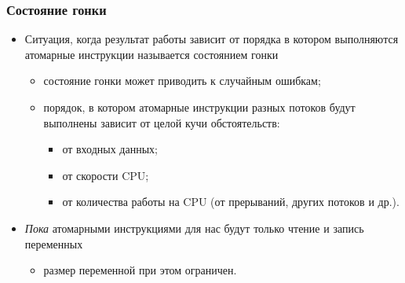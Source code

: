 \begin{frame}
\frametitle{Состояние гонки}
\begin{itemize}
  \item Ситуация, когда результат работы зависит от порядка в котором
  выполняются атомарные инструкции называется состоянием гонки
  \begin{itemize}
    \item состояние гонки может приводить к случайным ошибкам;
    \item порядок, в котором атомарные инструкции разных потоков будут выполнены
    зависит от целой кучи обстоятельств:
    \begin{itemize}
      \item от входных данных;
      \item от скорости CPU;
      \item от количества работы на CPU (от прерываний, других потоков и др.).
    \end{itemize}
  \end{itemize}
  \item \emph{Пока} атомарными инструкциями для нас будут только чтение и запись
  переменных
  \begin{itemize}
    \item размер переменной при этом ограничен.
  \end{itemize}
\end{itemize}
\end{frame}
